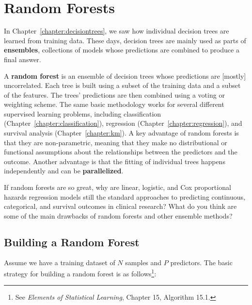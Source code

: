\chapter{Random Forests \label{chapter:randomforests}}

In Chapter~\ref{chapter:decisiontrees}, we saw how individual decision trees are learned from training data. These days, decision trees are mainly used as parts of \textbf{ensembles}, collections of models whose predictions are combined to produce a final answer. 

A \textbf{random forest} is an ensemble of decision trees whose predictions are [mostly] uncorrelated. Each tree is built using a subset of the training data and a subset of the features. The trees' predictions are then combined using a voting or weighting scheme. The same basic methodology works for several different supervised learning problems, including classification (Chapter~\ref{chapter:classification}), regression (Chapter~\ref{chapter:regression}), and survival analysis (Chapter~\ref{chapter:km}). A key advantage of random forests is that they are non-parametric, meaning that they make no distributional or functional assumptions about the relationships between the predictors and the outcome. Another advantage is that the fitting of individual trees happens independently and can be \textbf{parallelized}. 

\vspace{4mm}

\begin{question}{}
If random forests are so great, why are linear, logistic, and Cox proportional hazards regression models still the standard approaches to predicting continuous, categorical, and survival outcomes in clinical research? What do you think are some of the main drawbacks of random forests and other ensemble methods?
\end{question}


\section{Building a Random Forest}

Assume we have a training dataset of $N$ samples and $P$ predictors. The basic strategy for building a random forest is as follows\footnote{See \emph{Elements of Statistical Learning}, Chapter 15, Algorithm 15.1.}:

